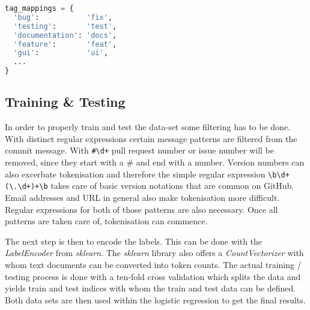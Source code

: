 \begin{lstlisting}[language=python, label={lst:tag_map}, caption={Dictionary for conventional tag mappings}]
tag_mappings = {
  'bug':           'fix',
  'testing':       'test',
  'documentation': 'docs',
  'feature':       'feat',
  'gui':           'ui',
  ...
}
\end{lstlisting}

\subsection{Training \& Testing}

In order to properly train and test the data-set some filtering has to be done.
With distinct regular expressions certain message patterns are filtered from
the commit message. With \lstinline{#\d+} pull request number or issue number
will be removed, since they start with a \# and end with a number. Version
numbers can also excerbate tokenisation and therefore the simple regular
expression \lstinline{\b\d+(\.\d+)+\b} takes care of basic version notations
that are common on GitHub. Email addresses and URL in general also make
tokenisation more difficult. Regular expressions for both of those patterns are
also necessary. Once all patterns are taken care of, tokenisation can commence.

The next step is then to encode the labels. This can be done  with the
\textit{LabelEncoder} from \textit{sklearn}. The \textit{sklearn} library also
offers a \textit{CountVectorizer} with whom text documents can be converted
into token counts. The actual training / testing process is done with a
ten-fold cross validation which splits the data and yields train and test
indices with whom the train and test data can be defined. Both data sets are
then used within the logistic regression to get the final results.
